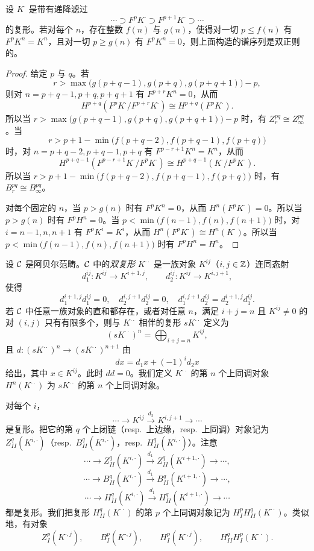 \begin{proposition}\label{it:2.2.7}
设 $K^{\cdot}$ 是带有递降滤过
\[
\cdots\supset F^pK^{\cdot}\supset F^{p+1}K^{\cdot}\supset\cdots
\]
的复形。若对每个 $n$，存在整数 $f(n)$ 与 $g(n)$，使得对一切 $p\le f(n)$ 有 $F^pK^n=K^n$，且对一切 $p\ge g(n)$ 有 $F^pK^n=0$，则上面构造的谱序列是双正则的。
\end{proposition}
\begin{proof}
给定 $p$ 与 $q$。若
\[
r>\max\bigl(g(p+q-1),g(p+q),g(p+q+1)\bigr)-p,
\]
则对 $n=p+q-1,p+q,p+q+1$ 有 $F^{p+r}K^n=0$，从而
\[
H^{p+q}(F^pK^{\cdot}/F^{p+r}K^{\cdot})\cong H^{p+q}(F^pK^{\cdot}).
\]
所以当 $r>\max\bigl(g(p+q-1),g(p+q),g(p+q+1)\bigr)-p$ 时，有 $Z_r^{pq}\cong Z_\infty^{pq}$。当
\[
r>p+1-\min\bigl(f(p+q-2),f(p+q-1),f(p+q)\bigr)
\]
时，对 $n=p+q-2,p+q-1,p+q$ 有 $F^{p-r+1}K^n=K^n$，从而
\[
H^{p+q-1}(F^{p-r+1}K^{\cdot}/F^pK^{\cdot})\cong H^{p+q-1}(K^{\cdot}/F^pK^{\cdot}).
\]
所以当 $r>p+1-\min\bigl(f(p+q-2),f(p+q-1),f(p+q)\bigr)$ 时，有 $B_r^{pq}\cong B_\infty^{pq}$。

对每个固定的 $n$，当 $p>g(n)$ 时有 $F^pK^n=0$，从而 $H^n(F^pK^{\cdot})=0$。所以当 $p>g(n)$ 时有 $F^pH^n=0$。当 $p<\min\bigl(f(n-1),f(n),f(n+1)\bigr)$ 时，对 $i=n-1,n,n+1$ 有 $F^pK^i=K^i$，从而 $H^n(F^pK^{\cdot})\cong H^n(K^{\cdot})$。所以当 $p<\min\bigl(f(n-1),f(n),f(n+1)\bigr)$ 时有 $F^pH^n=H^n$。
\end{proof}

设 $\mathcal{C}$ 是阿贝尔范畴。$\mathcal{C}$ 中的\emph{双复形} $K^{\cdot\cdot}$ 是一族对象 $K^{ij}$（$i,j\in\mathbb{Z}$）连同态射
\[
d_1^{ij}\colon K^{ij}\to K^{i+1,j},\qquad d_2^{ij}\colon K^{ij}\to K^{i,j+1},
\]
使得
\[
d_1^{i+1,j}d_1^{ij}=0,\quad d_2^{i,j+1}d_2^{ij}=0,\quad d_1^{i,j+1}d_2^{ij}=d_2^{i+1,j}d_1^{ij}.
\]
若 $\mathcal{C}$ 中任意一族对象的直和都存在，或者对任意 $n$，满足 $i+j=n$ 且 $K^{ij}\ne 0$ 的对 $(i,j)$ 只有有限多个，则与 $K^{\cdot\cdot}$ 相伴的复形 $sK^{\cdot\cdot}$ 定义为
\[
(sK^{\cdot\cdot})^n=\bigoplus_{i+j=n}K^{ij},
\]
且 $d\colon(sK^{\cdot\cdot})^n\to(sK^{\cdot\cdot})^{n+1}$ 由
\[
dx=d_1x+(-1)^id_2x
\]
给出，其中 $x\in K^{ij}$。此时 $dd=0$。我们定义 $K^{\cdot\cdot}$ 的第 $n$ 个上同调对象 $H^n(K^{\cdot\cdot})$ 为 $sK^{\cdot\cdot}$ 的第 $n$ 个上同调对象。

对每个 $i$，
\[
\cdots\to K^{ij}\xrightarrow{d_2}K^{i,j+1}\to\cdots
\]
是复形。把它的第 $q$ 个上闭链（resp.\ 上边缘，resp.\ 上同调）对象记为 $Z_{II}^q(K^{i,\cdot})$（resp.\ $B_{II}^q(K^{i,\cdot})$，resp.\ $H_{II}^q(K^{i,\cdot})$）。注意
\[
\cdots\to Z_{II}^q(K^{i,\cdot})\xrightarrow{d_1}Z_{II}^q(K^{i+1,\cdot})\to\cdots,
\]
\[
\cdots\to B_{II}^q(K^{i,\cdot})\xrightarrow{d_1}B_{II}^q(K^{i+1,\cdot})\to\cdots,
\]
\[
\cdots\to H_{II}^q(K^{i,\cdot})\xrightarrow{d_1}H_{II}^q(K^{i+1,\cdot})\to\cdots
\]
都是复形。我们把复形 $H_{II}^q(K^{\cdot\cdot})$ 的第 $p$ 个上同调对象记为 $H_I^pH_{II}^q(K^{\cdot\cdot})$。类似地，有对象
\[
Z_I^p(K^{\cdot,j}),\qquad B_I^p(K^{\cdot,j}),\qquad H_I^p(K^{\cdot,j}),\qquad H_{II}^qH_I^p(K^{\cdot\cdot}).
\]


